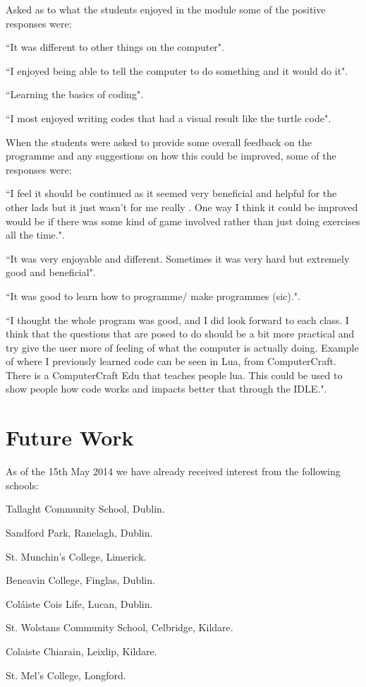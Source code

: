 \documentclass[a4paper]{article}
\begin{document}
Asked as to what the students enjoyed in the module some of the positive responses were:

\begin{compactitem}
  \item ``It was different to other things on the computer". 
  \item ``I enjoyed being able to tell the computer to do something and it would do it".
  \item ``Learning the basics of coding".
  \item ``I most enjoyed writing codes that had a visual result like the turtle code".
\end{compactitem}  

When the students were asked to provide some overall feedback on the programme and any suggestions on how this could be improved, some of the responses were:

\begin{compactitem}
  \item ``I feel it should be continued as it seemed very beneficial and helpful for the other lads but it just wasn't for me really . One way I think it could be improved would be if there was some kind of game involved rather than just doing exercises all the time.". 
  \item ``It was very enjoyable and different. Sometimes it was very hard but extremely good and beneficial".
  \item ``It was good to learn how to programme/ make programmes (sic).".
  \item ``I thought the whole program was good, and I did look forward to each class. I think that the questions that are posed to do should be a bit more practical and try give the user more of feeling of what the computer is actually doing. Example of where I previously learned code can be seen in Lua, from ComputerCraft. There is a ComputerCraft Edu that teaches people lua. This could be used to show people how code works and impacts better that through the IDLE.".
\end{compactitem}  


\section{Future Work} \label{Sect:FutWork}
As of the 15th May 2014 we have already received interest from the following schools:
\begin{compactitem}
  \item Tallaght Community School, Dublin. 
  \item Sandford Park, Ranelagh, Dublin.
  \item St. Munchin's College, Limerick.
  \item Beneavin College, Finglas, Dublin.
  \item Coláiste Cois Life, Lucan, Dublin.
  \item St. Wolstans Community School, Celbridge, Kildare. 
  \item Colaiste Chiarain, Leixlip, Kildare. 
  \item St. Mel's College, Longford.
\end{compactitem}  
\end{document}
